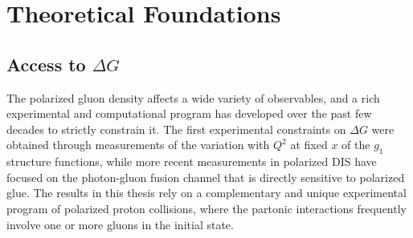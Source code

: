 \chapter{Theoretical Foundations}





\section{Access to $\Delta G$}

The polarized gluon density affects a wide variety of observables,
and a rich experimental and computational program has developed over the past
few decades to strictly constrain it. The first experimental constraints on
\(\Delta G\) were obtained through measurements of the variation with \(Q^2\)
at fixed \(x\) of the \(g_1\) structure functions, while more recent
measurements in polarized DIS have focused on the photon-gluon fusion channel
that is directly sensitive to polarized glue. The results in this thesis rely
on a complementary and unique experimental program of polarized proton
collisions, where the partonic interactions frequently involve one or more
gluons in the initial state.




